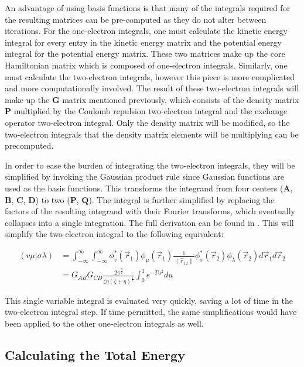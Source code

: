 \documentclass[10pt, oneside, letterpaper]{article}
\begin{document}
An advantage of using basis functions is that many of the integrals required for the resulting matrices can be pre-computed as they do not alter between iterations. For the one-electron integrals, one must calculate the kinetic energy integral for every entry in the kinetic energy matrix and the potential energy integral for the potential energy matrix. These two matrices make up the core Hamiltonian matrix which is composed of one-electron integrals. Similarly, one must calculate the two-electron integrals, however this piece is more complicated and more computationally involved. The result of these two-electron integrals will make up the $\bm{G}$ matrix mentioned previously, which consists of the density matrix $\bm{P}$ multiplied by the Coulomb repulsion two-electron integral and the exchange operator two-electron integral. Only the density matrix will be modified, so the two-electron integrals that the density matrix elements will be multiplying can be precomputed.

In order to ease the burden of integrating the two-electron integrals, they will be simplified by invoking the Gaussian product rule since Gaussian functions are used as the basis functions. This transforms the integrand from four centers ($\bm{A}$, $\bm{B}$, $\bm{C}$, $\bm{D}$) to two ($\bm{P}$, $\bm{Q}$). The integral is further simplified by replacing the factors of the resulting integrand with their Fourier transforms, which eventually collapses into a single integration. The full derivation can be found in \cite[p.~153-155,157]{molecular-integrals-over-gaussian-basis-functions}. This will simplify the two-electron integral to the following equivalent:

\begin{align*}
  (v\mu|\sigma\lambda) &= \int_{-\infty}^{\infty}\int_{-\infty}^{\infty}  \phi_v^\ast(\vec{r}_1)\phi_\mu(\vec{r}_1) \frac{1}{\|\vec{r}_{12}\|}  \phi_\sigma^\ast(\vec{r}_2)\phi_\lambda(\vec{r}_2)  d\vec{r}_1d\vec{r}_2 \\
  &= G_{AB}G_{CD}\frac{2\pi^{\frac{5}{2}}}{\zeta\eta(\zeta + \eta)^{\frac{1}{2}}} \int_{0}^{1}e^{-Tu^2}du
\end{align*}

This single variable integral is evaluated very quickly, saving a lot of time in the two-electron integral step. If time permitted, the same simplifications would have been applied to the other one-electron integrals as well.

\subsection{Calculating the Total Energy}
\end{document}
